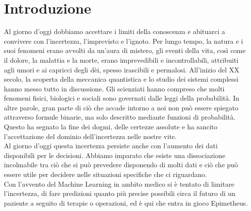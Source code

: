 \chapter{Introduzione}
\label{cap:introduzione}




Al giorno d'oggi dobbiamo accettare i limiti della conoscenza e abituarci a convivere con l'incertezza, l'imprevisto e l'ignoto. Per lungo tempo, la natura e i suoi fenomeni erano avvolti da un'aura di mistero, gli eventi della vita, così come il dolore, la malattia e la morte, erano imprevedibili e incontrollabili, attribuiti agli umori e ai capricci degli dèi, spesso irascibili e permalosi. All'inizio del XX secolo, la scoperta della meccanica quantistica e lo studio dei sistemi complessi hanno messo tutto in discussione. Gli scienziati hanno compreso che molti fenomeni fisici, biologici e sociali sono governati dalle leggi della probabilità. In altre parole, gran parte di ciò che accade intorno a noi non può essere spiegato attraverso formule binarie, ma solo descritto mediante funzioni di probabilità. Questo ha segnato la fine dei dogmi, delle certezze assolute e ha sancito l'accettazione del dominio dell'incertezza nelle nostre vite.\\
Al giorno d'oggi questa incertezza persiste anche con l'aumento dei dati disponibili per le decisioni. Abbiamo imparato che esiste una dissociazione incolmabile tra ciò che si può prevedere disponendo di molti dati e ciò che può essere utile per decidere nelle situazioni specifiche che ci riguardano. \\
Con l'avvento del Machine Learning in ambito medico si è tentato di limitare l'incertezza, di fare predizioni quanto più precise possibili circa il futuro di un paziente a seguito di terapie o operazioni, ed è qui che entra in gioco Epimetheus.\\

